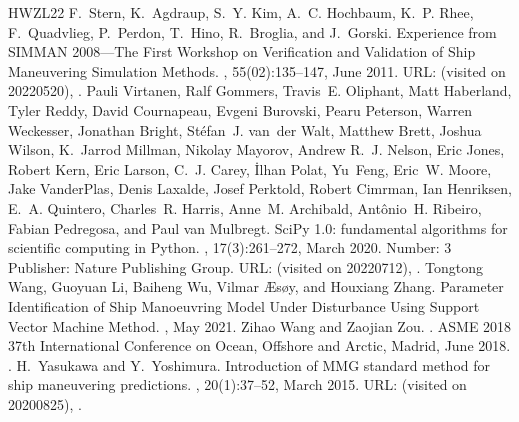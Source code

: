 \documentclass[review]{elsarticle}
\begin{document}
\begin{sphinxthebibliography}{HWZL22}
\sphinxAtStartPar
F. Stern, K. Agdraup, S. Y. Kim, A. C. Hochbaum, K. P. Rhee, F. Quadvlieg, P. Perdon, T. Hino, R. Broglia, and J. Gorski. Experience from SIMMAN 2008—The First Workshop on Verification and Validation of Ship Maneuvering Simulation Methods. , 55(02):135–147, June 2011. URL:  (visited on 2022\sphinxhyphen{}05\sphinxhyphen{}20), .
\sphinxAtStartPar
Pauli Virtanen, Ralf Gommers, Travis E. Oliphant, Matt Haberland, Tyler Reddy, David Cournapeau, Evgeni Burovski, Pearu Peterson, Warren Weckesser, Jonathan Bright, Stéfan J. van der Walt, Matthew Brett, Joshua Wilson, K. Jarrod Millman, Nikolay Mayorov, Andrew R. J. Nelson, Eric Jones, Robert Kern, Eric Larson, C. J. Carey, İlhan Polat, Yu Feng, Eric W. Moore, Jake VanderPlas, Denis Laxalde, Josef Perktold, Robert Cimrman, Ian Henriksen, E. A. Quintero, Charles R. Harris, Anne M. Archibald, Antônio H. Ribeiro, Fabian Pedregosa, and Paul van Mulbregt. SciPy 1.0: fundamental algorithms for scientific computing in Python. , 17(3):261–272, March 2020. Number: 3 Publisher: Nature Publishing Group. URL:  (visited on 2022\sphinxhyphen{}07\sphinxhyphen{}12), .
\sphinxAtStartPar
Tongtong Wang, Guoyuan Li, Baiheng Wu, Vilmar Æsøy, and Houxiang Zhang. Parameter Identification of Ship Manoeuvring Model Under Disturbance Using Support Vector Machine Method. , May 2021.
\sphinxAtStartPar
Zihao Wang and Zaojian Zou. . ASME 2018 37th International Conference on Ocean, Offshore and Arctic, Madrid, June 2018. .
\sphinxAtStartPar
H. Yasukawa and Y. Yoshimura. Introduction of MMG standard method for ship maneuvering predictions. , 20(1):37–52, March 2015. URL:  (visited on 2020\sphinxhyphen{}08\sphinxhyphen{}25), .

\end{sphinxthebibliography}
\end{document}

